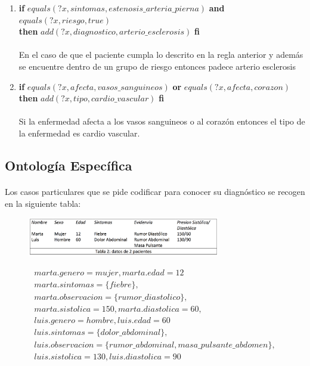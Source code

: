 \documentclass[10pt, a4paper,spanish]{article}
\begin{document}
\begin{enumerate}[label={\textbf{R\theenumi:}}]
				\item
					\textbf{if} $equals(?x, sintomas, estenosis\_arteria\_pierna)$ \textbf{and} $equals(?x, riesgo, true)$ \\
					\textbf{then} $add(?x, diagnostico, arterio\_esclerosis)$ \textbf{fi}
					\\ \\
					En el caso de que el paciente cumpla lo descrito en la regla anterior y además se encuentre dentro de un grupo de riesgo entonces padece arterio esclerosis

				\item
					\textbf{if} $equals(?x, afecta, vasos\_sanguineos)$ \textbf{or} $equals(?x, afecta, corazon)$ \\
					\textbf{then} $add(?x, tipo, cardio\_vascular)$ \textbf{fi}
					\\ \\
					Si la enfermedad afecta a los vasos sanguineos o al corazón entonces el tipo de la enfermedad es cardio vascular.


			\end{enumerate}

		\subsection{Ontología Específica}

			\paragraph{}
			Los casos particulares que se pide codificar para conocer su diagnóstico se recogen en la siguiente tabla:

			\begin{figure}[H]
				\begin{center}
					\includegraphics[width=0.75\textwidth]{table-2}
				\end{center}
			\end{figure}

			\begin{equation*}
				\begin{split}
					marta.genero=mujer, marta.edad=12 \\
					marta.sintomas=\{fiebre\}, \\
					marta.observacion=\{rumor\_diastolico\}, \\
					marta.sistolica=150, marta.diastolica=60,\\
					luis.genero=hombre, luis.edad=60 \\
					luis.sintomas=\{dolor\_abdominal\}, \\
					luis.observacion=\{rumor\_abdominal, masa\_pulsante\_abdomen\}, \\
					luis.sistolica=130, luis.diastolica=90\\
				\end{split}
			\end{equation*}
\end{document}
